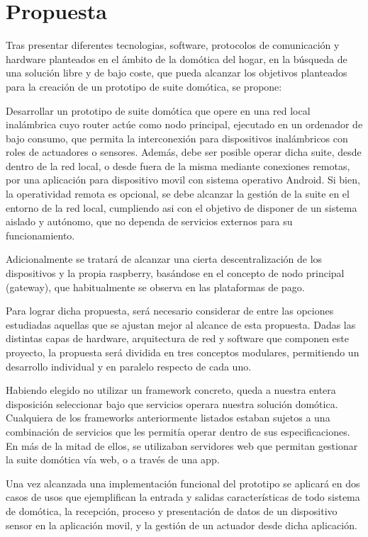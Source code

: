 \cleardoublepage

\chapter{Propuesta}
\label{ch:Capitulo3}

Tras presentar diferentes tecnologias, software, protocolos de comunicación y hardware planteados en el ámbito de la domótica del hogar, en la búsqueda de una solución libre y de bajo coste, que pueda alcanzar los objetivos planteados para la creación de un prototipo de suite domótica, se propone:

Desarrollar un prototipo de suite domótica que opere en una red local inalámbrica cuyo router actúe como nodo principal, ejecutado en un ordenador de bajo consumo, que permita la interconexión para dispositivos inalámbricos con roles de actuadores o sensores. Además, debe ser posible operar dicha suite, desde dentro de la red local, o desde fuera de la misma mediante conexiones remotas, por una aplicación para dispositivo movil con sistema operativo Android. Si bien, la operatividad remota es opcional, se debe alcanzar la gestión de la suite en el entorno de la red local, cumpliendo asi con el objetivo de disponer de un sistema aislado y autónomo, que no dependa de servicios externos para su funcionamiento.

Adicionalmente se tratará de alcanzar una cierta descentralización de los dispositivos y la propia raspberry, basándose en el concepto de nodo principal (gateway), que habitualmente se observa en las plataformas de pago.

Para lograr dicha propuesta, será necesario considerar de entre las opciones estudiadas aquellas que se ajustan mejor al alcance de esta propuesta. Dadas las distintas capas de hardware, arquitectura de red y software que componen este proyecto, la propuesta será dividida en tres conceptos modulares, permitiendo un desarrollo individual y en paralelo respecto de cada uno.

Habiendo elegido no utilizar un framework concreto, queda a nuestra entera disposición seleccionar bajo que servicios operara nuestra solución domótica. Cualquiera de los frameworks anteriormente listados estaban sujetos a una combinación de servicios que les permitía operar dentro de sus especificaciones. En más de la mitad de ellos, se utilizaban servidores web que permitan gestionar la suite domótica vía web, o a través de una app.

Una vez alcanzada una implementación funcional del prototipo se aplicará en dos casos de usos que ejemplifican la entrada y salidas características de todo sistema de domótica, la recepción, proceso y presentación de datos de un dispositivo sensor en la aplicación movil, y la gestión de un actuador desde dicha aplicación.

